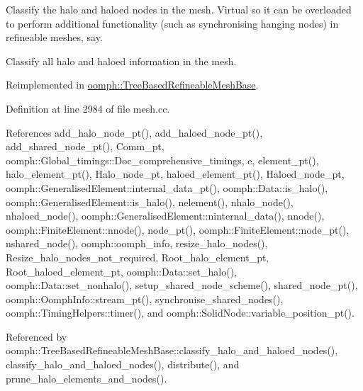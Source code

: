 Classify the halo and haloed nodes in the mesh. Virtual so it can be overloaded to perform additional functionality (such as synchronising hanging nodes) in refineable meshes, say. 

Classify all halo and haloed information in the mesh. 

Reimplemented in \hyperlink{classoomph_1_1TreeBasedRefineableMeshBase_aec7c6fc41272ec883c589ee56d1b01e6}{oomph\+::\+Tree\+Based\+Refineable\+Mesh\+Base}.



Definition at line 2984 of file mesh.\+cc.



References add\+\_\+halo\+\_\+node\+\_\+pt(), add\+\_\+haloed\+\_\+node\+\_\+pt(), add\+\_\+shared\+\_\+node\+\_\+pt(), Comm\+\_\+pt, oomph\+::\+Global\+\_\+timings\+::\+Doc\+\_\+comprehensive\+\_\+timings, e, element\+\_\+pt(), halo\+\_\+element\+\_\+pt(), Halo\+\_\+node\+\_\+pt, haloed\+\_\+element\+\_\+pt(), Haloed\+\_\+node\+\_\+pt, oomph\+::\+Generalised\+Element\+::internal\+\_\+data\+\_\+pt(), oomph\+::\+Data\+::is\+\_\+halo(), oomph\+::\+Generalised\+Element\+::is\+\_\+halo(), nelement(), nhalo\+\_\+node(), nhaloed\+\_\+node(), oomph\+::\+Generalised\+Element\+::ninternal\+\_\+data(), nnode(), oomph\+::\+Finite\+Element\+::nnode(), node\+\_\+pt(), oomph\+::\+Finite\+Element\+::node\+\_\+pt(), nshared\+\_\+node(), oomph\+::oomph\+\_\+info, resize\+\_\+halo\+\_\+nodes(), Resize\+\_\+halo\+\_\+nodes\+\_\+not\+\_\+required, Root\+\_\+halo\+\_\+element\+\_\+pt, Root\+\_\+haloed\+\_\+element\+\_\+pt, oomph\+::\+Data\+::set\+\_\+halo(), oomph\+::\+Data\+::set\+\_\+nonhalo(), setup\+\_\+shared\+\_\+node\+\_\+scheme(), shared\+\_\+node\+\_\+pt(), oomph\+::\+Oomph\+Info\+::stream\+\_\+pt(), synchronise\+\_\+shared\+\_\+nodes(), oomph\+::\+Timing\+Helpers\+::timer(), and oomph\+::\+Solid\+Node\+::variable\+\_\+position\+\_\+pt().



Referenced by oomph\+::\+Tree\+Based\+Refineable\+Mesh\+Base\+::classify\+\_\+halo\+\_\+and\+\_\+haloed\+\_\+nodes(), classify\+\_\+halo\+\_\+and\+\_\+haloed\+\_\+nodes(), distribute(), and prune\+\_\+halo\+\_\+elements\+\_\+and\+\_\+nodes().

\mbox{\label{classoomph_1_1Mesh_af2a6ebabea8704acadffb735a2c868bb}} 

